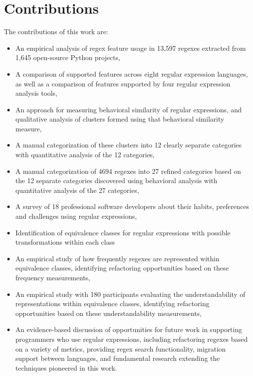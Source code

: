 \section{Contributions}

The contributions of this work are:
\begin{itemize} \setlength \itemsep{.1pt}
    \item An empirical analysis of regex feature usage in 13,597 regexes extracted from 1,645 open-source Python projects,
    \item A comparison of supported features across eight regular expression languages, as well as a comparison of features supported by four regular expression analysis tools,
    \item An approach for measuring behavioral similarity of regular expressions, and qualitative analysis of clusters formed using that behavioral similarity measure,
    \item A manual categorization of these clusters into 12 clearly separate categories with quantitative analysis of the 12 categories,
    \item A manual categorization of 4694 regexes into 27 refined categories based on the 12 separate categories discovered using behavioral analysis with quantitative analysis of the 27 categories,
    \item A survey of 18 professional software developers about their habits, preferences and challenges using regular expressions,
    \item Identification of equivalence classes for regular expressions with possible transformations within each class
    \item An empirical study of how frequently regexes are represented within equivalence classes, identifying refactoring opportunities based on these frequency measurements,
    \item An empirical study with 180 participants evaluating the understandability of representations within equivalence classes, identifying refactoring opportunities based on these understandability measurements,
    \item An evidence-based discussion of opportunities for future work in supporting programmers who use regular expressions, including refactoring regexes based on a variety of metrics, providing regex search functionality, migration support between languages, and fundamental research extending the techniques pioneered in this work.
\end{itemize}

